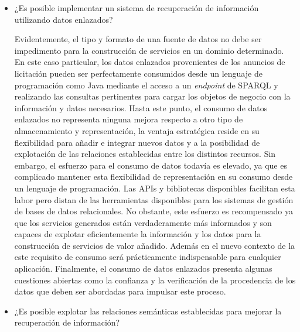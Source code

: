 \begin{itemize}
 \item ¿Es posible implementar un sistema de recuperación de información utilizando datos enlazados?

Evidentemente, el tipo y formato de una fuente de datos no debe ser impedimento para la construcción de servicios 
en un dominio determinado. En este caso particular, los datos enlazados provenientes de los anuncios de licitación 
pueden ser perfectamente consumidos desde un lenguaje de programación como Java mediante el acceso a un 
\textit{endpoint} de \gls{SPARQL} y realizando las consultas pertinentes para cargar los objetos de negocio con la 
información y datos necesarios. Hasta este punto, el consumo de datos enlazados no representa ninguna mejora 
respecto a otro tipo de almacenamiento y representación, la ventaja estratégica reside en su flexibilidad 
para añadir e integrar nuevos datos y a la posibilidad de explotación de las relaciones establecidas entre los distintos 
recursos. Sin embargo, el esfuerzo para el consumo de datos todavía es elevado, ya que es complicado mantener esta 
flexibilidad de representación en su consumo desde un lenguaje de programación. Las APIs y bibliotecas disponibles 
facilitan esta labor pero distan de las herramientas disponibles para los sistemas de gestión de bases 
de datos relacionales. No obstante, este esfuerzo es recompensado ya que los servicios generados están verdaderamente 
más informados y son capaces de explotar eficientemente la información y los datos para la construcción de servicios 
de valor añadido. Además en el nuevo contexto de la \wode este requisito de consumo será prácticamente indispensable 
para cualquier aplicación. Finalmente, el consumo de datos enlazados presenta algunas cuestiones abiertas como la 
confianza y la verificación de la procedencia de los datos que deben ser abordadas para impulsar este proceso.


 \item ¿Es posible explotar las relaciones semánticas establecidas para mejorar la recuperación de información?


\end{itemize}
